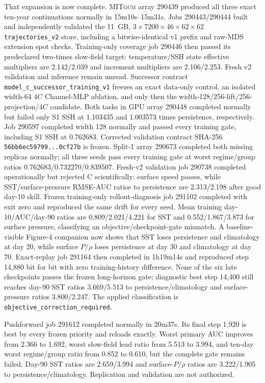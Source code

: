 \documentclass[11pt]{article}
\newcommand{\MITgcm}{\textsc{MITgcm}}
\begin{document}
That expansion is now complete.  \MITgcm{} array 290439 produced all three exact
ten-year continuations normally in 15m10s--15m31s.  Jobs 290443/290444 built and
independently validated the 11~GB, \(3\times7200\times46\times62\times62\)
\texttt{trajectories\_v2} store, including a bitwise-identical v1 prefix and raw-MDS
extension spot checks.  Training-only coverage job 290446 then passed its predeclared
two-times slow-field target: temperature/SSH state effective multipliers are
2.142/2.039 and increment multipliers are 2.106/2.253.  Fresh v2 validation and
inference remain unread.  Successor contract
\texttt{model\_c\_successor\_training\_v1} freezes an exact data-only control, an
isolated width-64 \(4C\) Channel-MLP ablation, and only then the
width-128/256-lift/256-projection/\(4C\) candidate.  Both tasks in GPU array 290448
completed normally but failed only S1 SSH at 1.103435 and 1.003573 times persistence,
respectively.  Job 290597 completed width 128 normally and passed every training gate,
including S1 SSH at 0.762683.  Corrected validation contract SHA-256
\texttt{56bb6ec59799...0cf27b} is frozen.  Split-1 array 290673 completed both missing
replicas normally; all three seeds pass every training gate at worst regime/group
ratios 0.762683/0.732270/0.839507.  Fresh-v2 validation job 290738 completed
operationally but rejected C scientifically: surface speed passes, while
SST/surface-pressure RMSE-AUC ratios to persistence are 2.313/2.198 after good
day-10 skill.  Frozen training-only rollout-diagnosis job 291102 completed with exit
zero and reproduced the same drift for every seed.  Mean training
day-10/AUC/day-90 ratios are 0.809/2.021/4.221 for SST and
0.552/1.867/3.873 for surface pressure, classifying an objective/checkpoint-gate
mismatch.  A baseline-visible Figure-4 companion now shows that SST loses persistence
and climatology at day 20, while surface \(P/\rho\) loses persistence at day 30 and
climatology at day 70.  Exact-replay job 291164 then completed in 1h19m14s and
reproduced step 14,880 bit for bit with zero training-history difference.  None of
the six late checkpoints passes the frozen long-horizon gate; diagnostic best step
14,400 still reaches day-90 SST ratios 3.669/5.513 to persistence/climatology and
surface-pressure ratios 3.800/2.247.  The applied classification is
\texttt{objective\_correction\_required}.

Pushforward job 291612 completed normally in 20m37s.  Its final step 1,920 is best by
every frozen priority and reloads exactly.  Worst primary AUC improves from 2.366 to
1.692, worst slow-field lead ratio from 5.513 to 3.994, and ten-day worst
regime/group ratio from 0.852 to 0.610, but the complete gate remains failed.
Day-90 SST ratios are 2.659/3.994 and surface-\(P/\rho\) ratios are 3.222/1.905 to
persistence/climatology.  Replication and validation are not authorized.
\end{document}
